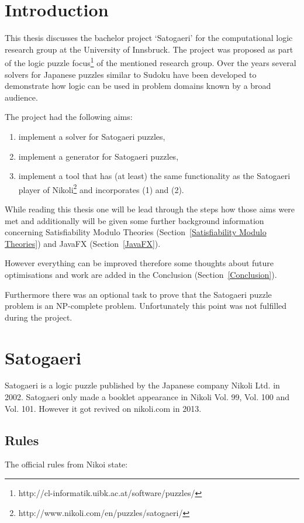 
\chapter{Introduction} \label{Introduction}
This thesis discusses the bachelor project `Satogaeri' for the computational logic research group at the University of Innsbruck. The project was proposed as part of the logic puzzle focus\footnote{http://cl-informatik.uibk.ac.at/software/puzzles/} of the mentioned research group. Over the years several solvers for Japanese puzzles similar to Sudoku have been developed to demonstrate how logic can be used in problem domains known by a broad audience.

The project had the following aims: 
\begin{enumerate}
	\item implement a solver for Satogaeri puzzles,
	\item implement a generator for Satogaeri puzzles,
	\item implement a tool that has (at least) the same functionality as the Satogaeri player of Nikoli\footnote{http://www.nikoli.com/en/puzzles/satogaeri/} and incorporates (1) and (2).
\end{enumerate}

While reading this thesis one will be lead through the steps how those aims were met and additionally will be given some further background information concerning Satisfiability Modulo Theories (Section~\ref{Satisfiability Modulo Theories}) and JavaFX (Section~\ref{JavaFX}).

However everything can be improved therefore some thoughts about future optimisations and work are added in the Conclusion (Section~\ref{Conclusion}).

Furthermore there was an optional task to prove that the Satogaeri puzzle problem is an NP-complete problem. Unfortunately this point was not fulfilled during the project.

\chapter{Satogaeri} \label{Satogaeri}
Satogaeri is a logic puzzle published by the Japanese company Nikoli Ltd. in 2002. Satogaeri only made a booklet appearance in Nikoli Vol. 99, Vol. 100 and Vol. 101. However it got revived on nikoli.com in 2013.

\section{Rules}
The official rules from Nikoi state:

